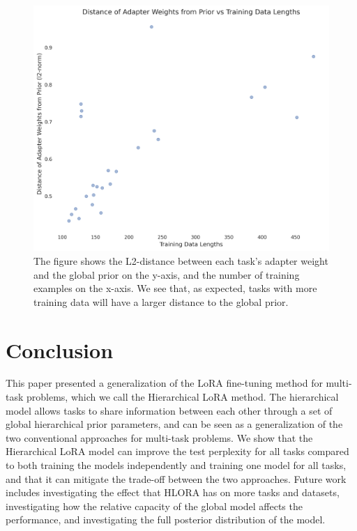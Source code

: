 \documentclass{article}
\begin{document}
\begin{figure}[h]
    \centering
    \includegraphics[width=\textwidth]{figures/weights_vs_data_lengths.png}
    \caption{The figure shows the L2-distance between each task's adapter weight and the global prior on the y-axis, and the number of training examples on the x-axis. We see that, as expected, tasks with more training data will have a larger distance to the global prior.}
    \label{fig:weights_vs_datalen} 
\end{figure}

\section{Conclusion}
This paper presented a generalization of the LoRA fine-tuning method for multi-task problems, which we call the Hierarchical LoRA method. The hierarchical model allows tasks to share information between each other through a set of global hierarchical prior parameters, and can be seen as a generalization of the two conventional approaches for multi-task problems. We show that the Hierarchical LoRA model can improve the test perplexity for all tasks compared to both training the models independently and training one model for all tasks, and that it can mitigate the trade-off between the two approaches.
Future work includes investigating the effect that HLORA has on more tasks and datasets, investigating how the relative capacity of the global model affects the performance, and investigating the full posterior distribution of the model.
\end{document}
